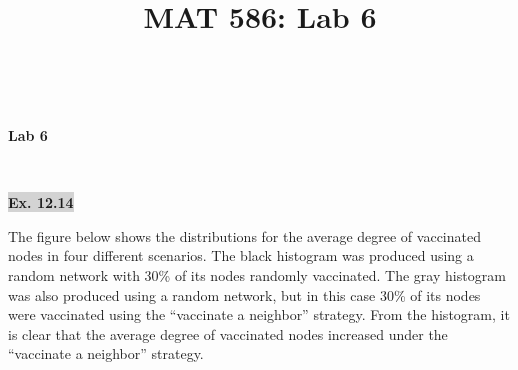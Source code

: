 \documentclass[11pt]{article}
\title{MAT 586: Lab 6}
\newcommand\textbox[1]{%
  \parbox{.333\textwidth}{#1}%
}
\newcommand{\mybox}{%
    \collectbox{%
        \setlength{\fboxsep}{2pt}%
        \fbox{\BOXCONTENT}%
    }%
}
\begin{document}
\begin{center}
\vspace{-0.6cm}
\hrulefill \\
\vspace{-0.7cm}
\hrulefill

\vspace{-0.5cm}
\vspace{-5mm}
\begin{large}
\textbf{Lab 6} \\
\end{large}

\vspace{5mm}


\vspace{-0.65cm}
\hrulefill \\
\vspace{-0.7cm}
\hrulefill
\end{center}

\begin{center}
\end{center}

\vspace{5mm}

\noindent\mybox{\colorbox{lightgray}{\textbf{Ex. 12.14}}}\hspace{3mm}\hrulefill 

\noindent The figure below shows the distributions for the average degree of vaccinated nodes in four different scenarios. The black histogram was produced using a random network with 30\% of its nodes randomly vaccinated. The gray histogram was also produced using a random network, but in this case 30\% of its nodes were vaccinated using the ``vaccinate a neighbor'' strategy. From the histogram, it is clear that the average degree of vaccinated nodes increased under the ``vaccinate a neighbor'' strategy. 
\end{document}
